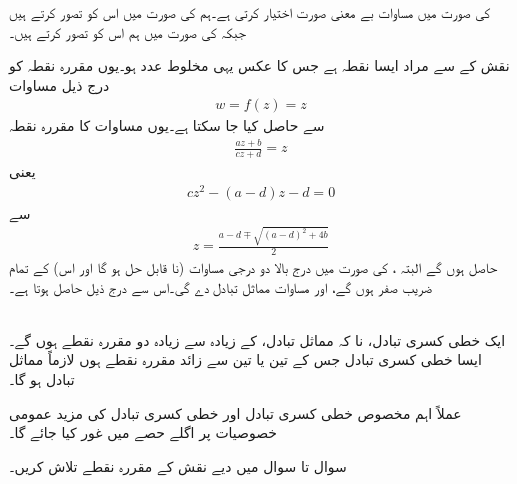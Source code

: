  کی صورت میں مساوات  بے معنی صورت  اختیار کرتی ہے۔ہم  کی صورت میں اس کو  تصور کرتے ہیں جبکہ  کی صورت میں ہم اس کو  تصور کرتے ہیں۔

 نقش  کے  سے مراد ایسا نقطہ ہے جس کا عکس یہی مخلوط عدد ہو۔یوں مقررہ نقطہ کو درج ذیل مساوات 
\begin{align*}
w=f(z)=z
\end{align*}
سے حاصل کیا جا سکتا ہے۔یوں مساوات  کا مقررہ نقطہ
\begin{align*}
\frac{az+b}{cz+d}=z
\end{align*}
یعنی
\begin{align}\label{مساوات_نقش_دو_درجی_الف}
cz^2-(a-d)z-d=0
\end{align}
سے
\begin{align*}
z=\frac{a-d\mp\sqrt{(a-d)^2+4b}}{2}
\end{align*}
 حاصل ہوں گے البتہ ،  کی صورت میں درج بالا دو درجی مساوات (نا قابل حل ہو گا اور اس) کے تمام  ضریب  صفر ہوں گے، اور مساوات   مماثل تبادل  دے  گی۔اس سے درج ذیل حاصل ہوتا ہے۔

\quad {}\\
ایک خطی کسری تبادل، نا کہ مماثل تبادل، کے زیادہ سے زیادہ دو  مقررہ نقطے ہوں گے۔ایسا خطی کسری تبادل جس کے تین یا تین سے زائد مقررہ نقطے ہوں لازماً مماثل تبادل ہو گا۔

عملاً اہم مخصوص خطی کسری تبادل اور خطی کسری تبادل کی مزید عمومی خصوصیات پر اگلے حصے میں غور کیا جائے گا۔

سوال  تا سوال  میں دیے نقش کے مقررہ نقطے تلاش کریں۔


